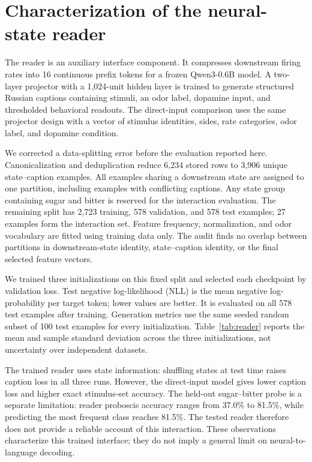 \section{Characterization of the neural-state reader}
\label{sec:reader}
The reader is an auxiliary interface component. It compresses downstream firing rates into 16 continuous prefix tokens for a frozen Qwen3-0.6B model. A two-layer projector with a 1,024-unit hidden layer is trained to generate structured Russian captions containing stimuli, an odor label, dopamine input, and thresholded behavioral readouts. The direct-input comparison uses the same projector design with a vector of stimulus identities, sides, rate categories, odor label, and dopamine condition.

We corrected a data-splitting error before the evaluation reported here. Canonicalization and deduplication reduce 6,234 stored rows to 3,906 unique state--caption examples. All examples sharing a downstream state are assigned to one partition, including examples with conflicting captions. Any state group containing sugar and bitter is reserved for the interaction evaluation. The remaining split has 2,723 training, 578 validation, and 578 test examples; 27 examples form the interaction set. Feature frequency, normalization, and odor vocabulary are fitted using training data only. The audit finds no overlap between partitions in downstream-state identity, state--caption identity, or the final selected feature vectors.

We trained three initializations on this fixed split and selected each checkpoint by validation loss. Test negative log-likelihood (NLL) is the mean negative log-probability per target token; lower values are better. It is evaluated on all 578 test examples after training. Generation metrics use the same seeded random subset of 100 test examples for every initialization. Table~\ref{tab:reader} reports the mean and sample standard deviation across the three initializations, not uncertainty over independent datasets.


The trained reader uses state information: shuffling states at test time raises caption loss in all three runs. However, the direct-input model gives lower caption loss and higher exact stimulus-set accuracy. The held-out sugar--bitter probe is a separate limitation: reader proboscis accuracy ranges from 37.0\% to 81.5\%, while predicting the most frequent class reaches 81.5\%. The tested reader therefore does not provide a reliable account of this interaction. These observations characterize this trained interface; they do not imply a general limit on neural-to-language decoding.

